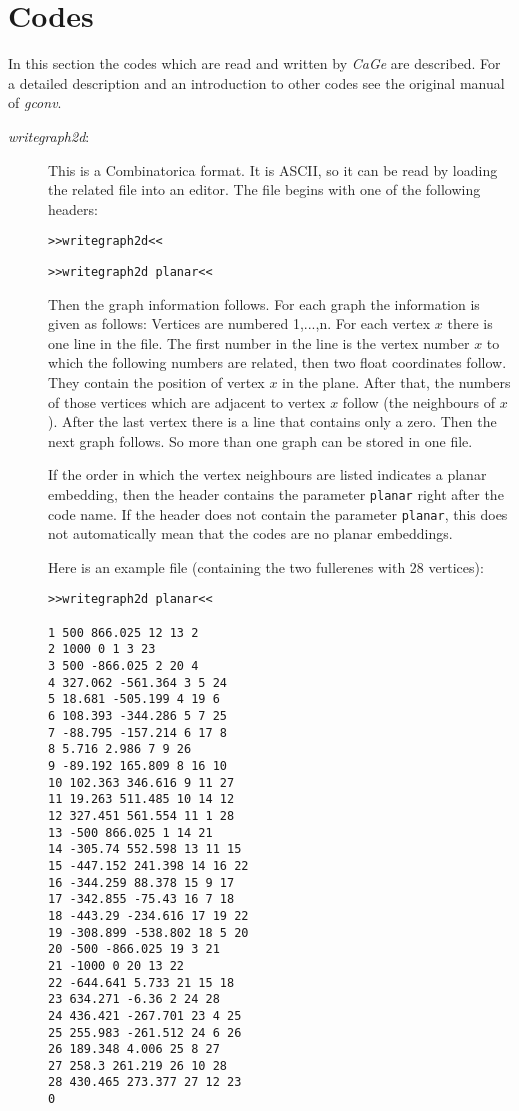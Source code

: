 \documentclass[a4paper]{article}
\def\CaGe{\textit{CaGe}}
\begin{document}
\section{\label{codes}Codes}

In this section the codes which are read and written by \CaGe{} are 
described. For a detailed description and an introduction to other codes
see the original manual of \textit{gconv}.

\begin{description}
\item[\textit{writegraph2d}:]
  This is a Combinatorica format. It is ASCII, so it can be read by loading
  the related file into an editor.
  The file begins with one of the following headers:
\begin{center}
   \texttt{>>writegraph2d<<}

   \texttt{>>writegraph2d planar<<}
\end{center}
Then the graph information follows. For each graph the information
 is given as follows: Vertices are numbered 1,...,n.
  For each vertex $x$ there is one line in the file. The first number in the 
  line is the vertex number $x$ to which the following numbers are related, 
  then two float coordinates follow. They contain the
  position of vertex $x$ in the plane. After that, 
  the numbers of those vertices
  which are adjacent to vertex $x$ follow (the neighbours of $x$). 
  After the last vertex there is a line that contains only a zero. Then the
  next graph follows. So more than one graph can be stored in one file.

If the order in which the vertex neighbours are listed indicates
    a planar embedding, then the header contains the parameter \texttt{planar} 
    right after the code name. If the header does not contain the parameter
\texttt{planar}, this does not automatically mean that the codes are no planar
    embeddings.

  Here is an example file (containing the two fullerenes with 28 vertices):
\begin{verbatim}
>>writegraph2d planar<<

1 500 866.025 12 13 2
2 1000 0 1 3 23
3 500 -866.025 2 20 4
4 327.062 -561.364 3 5 24
5 18.681 -505.199 4 19 6
6 108.393 -344.286 5 7 25
7 -88.795 -157.214 6 17 8
8 5.716 2.986 7 9 26
9 -89.192 165.809 8 16 10
10 102.363 346.616 9 11 27
11 19.263 511.485 10 14 12
12 327.451 561.554 11 1 28
13 -500 866.025 1 14 21
14 -305.74 552.598 13 11 15
15 -447.152 241.398 14 16 22
16 -344.259 88.378 15 9 17
17 -342.855 -75.43 16 7 18
18 -443.29 -234.616 17 19 22
19 -308.899 -538.802 18 5 20
20 -500 -866.025 19 3 21
21 -1000 0 20 13 22
22 -644.641 5.733 21 15 18
23 634.271 -6.36 2 24 28
24 436.421 -267.701 23 4 25
25 255.983 -261.512 24 6 26
26 189.348 4.006 25 8 27
27 258.3 261.219 26 10 28
28 430.465 273.377 27 12 23
0


\end{verbatim}
\end{description}
\end{document}
